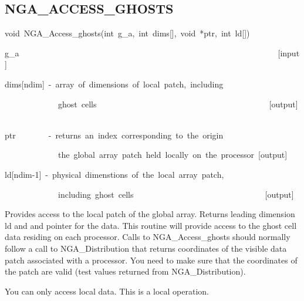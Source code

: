 \subsection*{\label{sub:NGA_ACCESS_GHOSTS}NGA\_ACCESS\_GHOSTS}
\begin{lyxcode}
void~NGA\_Access\_ghosts(int~g\_a,~int~dims{[}{]},~void~{*}ptr,~int~ld{[}{]})



g\_a~~~~~~~~~~~~~~~~~~~~~~~~~~~~~~~~~~~~~~~~~~~~~~~~~~~~~~~~~~~~~~~{[}input{]}~

dims{[}ndim{]}~-~array~of~dimensions~of~local~patch,~including~

~~~~~~~~~~~~~ghost~cells~~~~~~~~~~~~~~~~~~~~~~~~~~~~~~~~~~~~~~~~~~{[}output{]}~

ptr~~~~~~~~-~returns~an~index~corresponding~to~the~origin~

~~~~~~~~~~~~~the~global~array~patch~held~locally~on~the~processor~{[}output{]}~

ld{[}ndim-1{]}~-~physical~dimenstions~of~the~local~array~patch,~

~~~~~~~~~~~~~including~ghost~cells~~~~~~~~~~~~~~~~~~~~~~~~~~~~~~~~{[}output{]}
\end{lyxcode}
Provides access to the local patch of the global array. Returns leading
dimension ld and and pointer for the data. This routine will provide
access to the ghost cell data residing on each processor. Calls to
NGA\_Access\_ghosts should normally follow a call to NGA\_Distribution
that returns coordinates of the visible data patch associated with
a processor. You need to make sure that the coordinates of the patch
are valid (test values returned from NGA\_Distribution).

You can only access local data. This is a local operation. 


